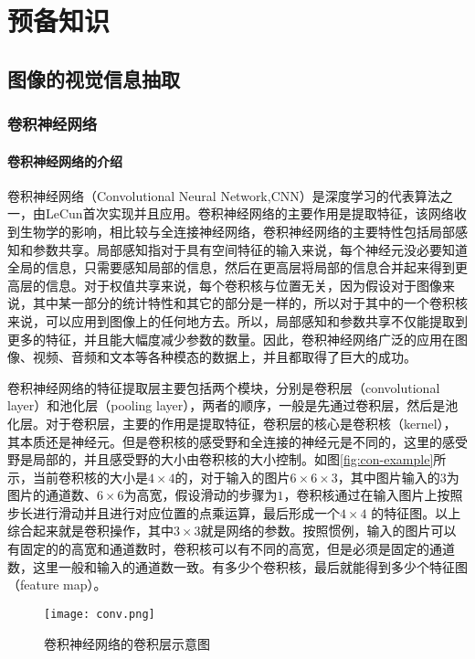 
\chapter{预备知识}
\label{ch:pre}



\section{图像的视觉信息抽取}



\subsection{卷积神经网络}

\subsubsection{卷积神经网络的介绍}
卷积神经网络（Convolutional Neural Network,CNN）是深度学习的代表算法之一，由LeCun首次实现并且应用。卷积神经网络的主要作用是提取特征，该网络收到生物学的影响，相比较与全连接神经网络，卷积神经网络的主要特性包括局部感知和参数共享。局部感知指对于具有空间特征的输入来说，每个神经元没必要知道全局的信息，只需要感知局部的信息，然后在更高层将局部的信息合并起来得到更高层的信息。对于权值共享来说，每个卷积核与位置无关，因为假设对于图像来说，其中某一部分的统计特性和其它的部分是一样的，所以对于其中的一个卷积核来说，可以应用到图像上的任何地方去。所以，局部感知和参数共享不仅能提取到更多的特征，并且能大幅度减少参数的数量。因此，卷积神经网络广泛的应用在图像、视频、音频和文本等各种模态的数据上，并且都取得了巨大的成功。

卷积神经网络的特征提取层主要包括两个模块，分别是卷积层（convolutional layer）和池化层（pooling layer），两者的顺序，一般是先通过卷积层，然后是池化层。对于卷积层，主要的作用是提取特征，卷积层的核心是卷积核（kernel），其本质还是神经元。但是卷积核的感受野和全连接的神经元是不同的，这里的感受野是局部的，并且感受野的大小由卷积核的大小控制。如图\ref{fig:con-example}所示，当前卷积核的大小是$4 \times 4$的，对于输入的图片$6 \times 6 \times 3$，其中图片输入的3为图片的通道数、$6 \times 6$为高宽，假设滑动的步骤为$1$，卷积核通过在输入图片上按照步长进行滑动并且进行对应位置的点乘运算，最后形成一个$4 \times 4$ 的特征图。以上综合起来就是卷积操作，其中$3 \times 3$就是网络的参数。按照惯例，输入的图片可以有固定的的高宽和通道数时，卷积核可以有不同的高宽，但是必须是固定的通道数，这里一般和输入的通道数一致。有多少个卷积核，最后就能得到多少个特征图（feature map）。
\begin{figure}[htpb]
	\centering
	\texttt{[image: conv.png]}
    \caption{卷积神经网络的卷积层示意图}
	\vspace*{-3.5mm}
	\label{fig:conv-example}
\end{figure}

